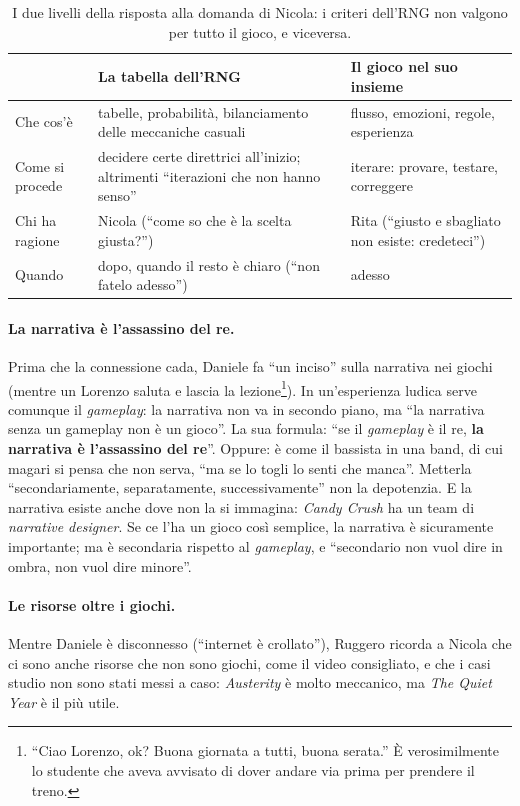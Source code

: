\begin{table}[htbp]
\centering
\small
\begin{tabular}{@{}p{3.2cm}p{4.9cm}p{4.9cm}@{}}
\toprule
 & \textbf{La tabella dell'RNG} & \textbf{Il gioco nel suo insieme} \\
\midrule
Che cos'è & tabelle, probabilità, bilanciamento delle meccaniche casuali & flusso,
emozioni, regole, esperienza \\
Come si procede & decidere certe direttrici all'inizio; altrimenti ``iterazioni che non
hanno senso'' & iterare: provare, testare, correggere \\
Chi ha ragione & Nicola (``come so che è la scelta giusta?'') & Rita (``giusto e
sbagliato non esiste: credeteci'') \\
Quando & dopo, quando il resto è chiaro (``non fatelo adesso'') & adesso \\
\bottomrule
\end{tabular}
\caption{I due livelli della risposta alla domanda di Nicola: i criteri dell'RNG non
valgono per tutto il gioco, e viceversa.}
\label{a11:tab:livelli}
\end{table}

\paragraph{La narrativa è l'assassino del re.} Prima che la connessione cada, Daniele fa
``un inciso'' sulla narrativa nei giochi (mentre un Lorenzo saluta e lascia la
lezione\footnote{``Ciao Lorenzo, ok? Buona giornata a tutti, buona serata.'' È
verosimilmente lo studente che aveva avvisato di dover andare via prima per prendere il
treno.}). In un'esperienza ludica serve comunque il \emph{gameplay}: la narrativa non va
in secondo piano, ma ``la narrativa senza un gameplay non è un gioco''. La sua formula:
``se il \emph{gameplay} è il re, \textbf{la narrativa è l'assassino del re}''. Oppure: è
come il bassista in una band, di cui magari si pensa che non serva, ``ma se lo togli lo
senti che manca''. Metterla ``secondariamente, separatamente, successivamente'' non la
depotenzia. E la narrativa esiste anche dove non la si immagina: \emph{Candy Crush} ha un
team di \emph{narrative designer}. Se ce l'ha un gioco così semplice, la narrativa è
sicuramente importante; ma è secondaria rispetto al \emph{gameplay}, e ``secondario non
vuol dire in ombra, non vuol dire minore''.

\paragraph{Le risorse oltre i giochi.} Mentre Daniele è disconnesso (``internet è
crollato''), Ruggero ricorda a Nicola che ci sono anche risorse che non sono giochi, come
il video consigliato, e che i casi studio non sono stati messi a caso: \emph{Austerity} è
molto meccanico, ma \emph{The Quiet Year} è il più utile.

